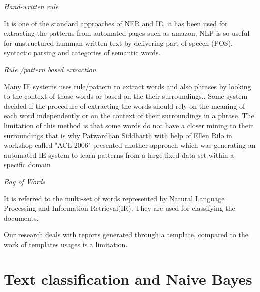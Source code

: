 
\textit{Hand-written rule}

It is one of the standard approaches of NER and IE, it has been used for extracting the patterns from automated pages such as amazon, NLP is so useful for unstructured humman-written text by delivering  part-of-speech (POS), syntactic parsing and categories of semantic words.

\textit{Rule /pattern based extraction}

Many IE systems uses rule/pattern to extract words and also phrases by looking to the context of those words or based on the their surroundings.\citep{califf2003bottom}. Some system decided if the procedure of extracting the words should rely on the meaning of each word independently or on the context of their surroundings in a phrase.
The limitation of this method is that some words do not have a closer mining to their surroundings that is why Patwardhan Siddharth with help of Ellen Rilo  in workshop called "ACL 2006" presented another approach which  was  generating an automated IE system to learn patterns from a large fixed data set  within a specific domain \citep{patwardhan2007effective} 

\textit{Bag of Words} 

It is referred to the multi-set of words represented by Natural Language Processing and Information Retrieval(IR). They are used  for classifying the documents.

Our research deals with reports generated through a template, compared to the work of  \citep{patwardhan2007effective} templates usages is a limitation.

\section{Text classification and Naive Bayes}


